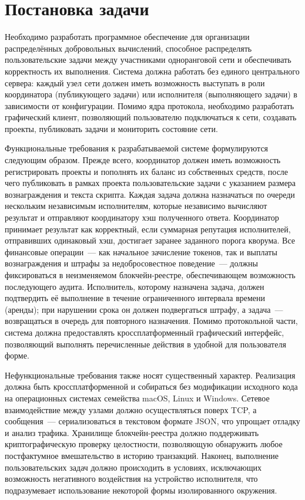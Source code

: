 \documentclass[a4paper,11pt]{extarticle}
\begin{document}
\section{Постановка задачи}

Необходимо разработать программное обеспечение для организации распределённых
добровольных вычислений, способное распределять пользовательские задачи между
участниками одноранговой сети и обеспечивать корректность их выполнения. Система
должна работать без единого центрального сервера: каждый узел сети должен иметь
возможность выступать в роли координатора (публикующего задачи) или исполнителя
(выполняющего задачи) в зависимости от конфигурации. Помимо ядра протокола,
необходимо разработать графический клиент, позволяющий пользователю подключаться
к сети, создавать проекты, публиковать задачи и мониторить состояние сети.

Функциональные требования к разрабатываемой системе формулируются следующим
образом. Прежде всего, координатор должен иметь возможность регистрировать
проекты и пополнять их баланс из собственных средств, после чего публиковать в
рамках проекта пользовательские задачи с указанием размера вознаграждения и
текста скрипта. Каждая задача должна назначаться по очереди нескольким
независимым исполнителям, которые независимо вычисляют результат и отправляют
координатору хэш полученного ответа. Координатор принимает результат как
корректный, если суммарная репутация исполнителей, отправивших одинаковый хэш,
достигает заранее заданного порога кворума. Все финансовые операции~--- как
начальное зачисление токенов, так и выплаты вознаграждения и штрафы за
недобросовестное поведение~--- должны фиксироваться в неизменяемом блокчейн-реестре,
обеспечивающем возможность последующего аудита. Исполнитель, которому назначена
задача, должен подтвердить её выполнение в течение ограниченного интервала
времени (аренды); при нарушении срока он должен подвергаться штрафу, а задача~---
возвращаться в очередь для повторного назначения. Помимо протокольной части,
система должна предоставлять кроссплатформенный графический интерфейс,
позволяющий выполнять перечисленные действия в удобной для пользователя форме.

Нефункциональные требования также носят существенный характер. Реализация должна
быть кроссплатформенной и собираться без модификации исходного кода на
операционных системах семейства macOS, Linux и Windows. Сетевое взаимодействие
между узлами должно осуществляться поверх TCP, а сообщения~--- сериализоваться в
текстовом формате JSON, что упрощает отладку и анализ трафика. Хранилище
блокчейн-реестра должно поддерживать криптографическую проверку целостности,
позволяющую обнаружить любое постфактумное вмешательство в историю транзакций.
Наконец, выполнение пользовательских задач должно происходить в условиях,
исключающих возможность негативного воздействия на устройство исполнителя, что
подразумевает использование некоторой формы изолированного окружения.
\end{document}
